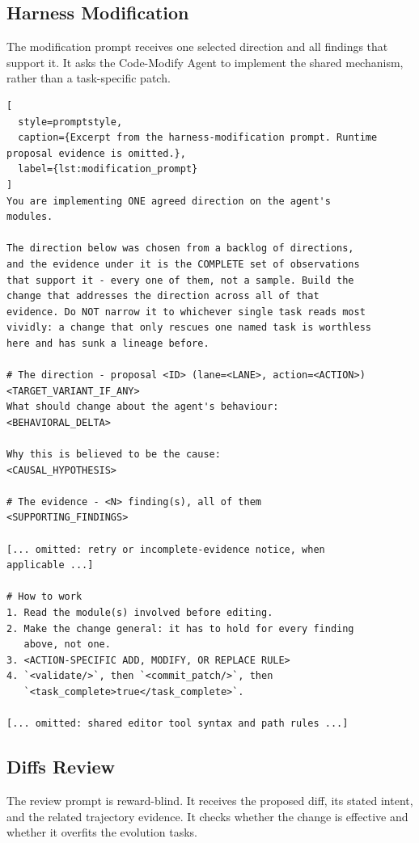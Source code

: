 \documentclass{article} %
\begin{document}
\subsection{Harness Modification}
\label{appendix:harness_modification}

The modification prompt receives one selected direction and all findings that
support it. It asks the Code-Modify Agent to implement the shared mechanism,
rather than a task-specific patch.

\begin{lstlisting}[
  style=promptstyle,
  caption={Excerpt from the harness-modification prompt. Runtime proposal evidence is omitted.},
  label={lst:modification_prompt}
]
You are implementing ONE agreed direction on the agent's
modules.

The direction below was chosen from a backlog of directions,
and the evidence under it is the COMPLETE set of observations
that support it - every one of them, not a sample. Build the
change that addresses the direction across all of that
evidence. Do NOT narrow it to whichever single task reads most
vividly: a change that only rescues one named task is worthless
here and has sunk a lineage before.

# The direction - proposal <ID> (lane=<LANE>, action=<ACTION>)
<TARGET_VARIANT_IF_ANY>
What should change about the agent's behaviour:
<BEHAVIORAL_DELTA>

Why this is believed to be the cause:
<CAUSAL_HYPOTHESIS>

# The evidence - <N> finding(s), all of them
<SUPPORTING_FINDINGS>

[... omitted: retry or incomplete-evidence notice, when
applicable ...]

# How to work
1. Read the module(s) involved before editing.
2. Make the change general: it has to hold for every finding
   above, not one.
3. <ACTION-SPECIFIC ADD, MODIFY, OR REPLACE RULE>
4. `<validate/>`, then `<commit_patch/>`, then
   `<task_complete>true</task_complete>`.

[... omitted: shared editor tool syntax and path rules ...]
\end{lstlisting}

\subsection{Diffs Review}
\label{appendix:diff_review}

The review prompt is reward-blind. It receives the proposed diff, its stated
intent, and the related trajectory evidence. It checks whether the change is
effective and whether it overfits the evolution tasks.
\end{document}
